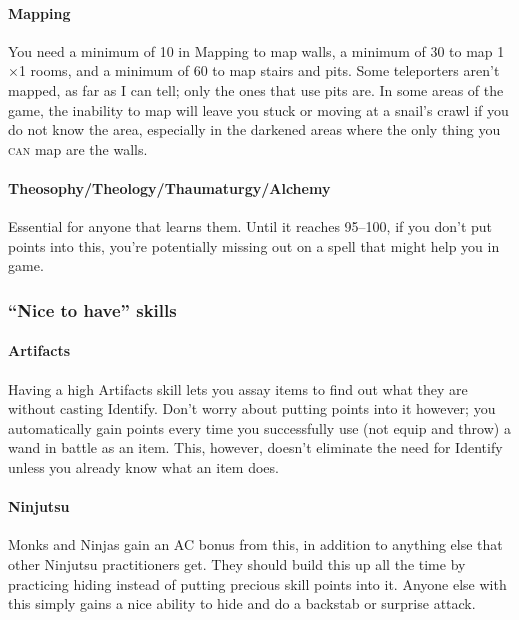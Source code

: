 \documentclass[12pt]{article}
\let\oldparagraph\paragraph
\renewcommand{\paragraph}[1]{\oldparagraph{#1}\mbox{}}
\newcommand{\indexSpell}[1]{\index{#1}}
\newcommand{\spell}[1]{#1\indexSpell{#1}}
\newcommand{\indexClass}[1]{\index{#1}}
\newcommand{\class}[1]{#1\indexClass{#1}}
\newcommand\textlcsc[1]{\texorpdfstring{\textsc{\MakeLowercase{#1}}}{#1}}
\begin{document}
\paragraph{Mapping} You need a minimum of 10 in Mapping to map walls, a
minimum of 30 to map 1$\times$1 rooms, and a minimum of 60 to map stairs and
pits. Some teleporters aren't mapped, as far as I can tell; only the ones
that use pits are. In some areas of the game, the inability to map will leave
you stuck or moving at a snail's crawl if you do not know the area,
especially in the darkened areas where the only thing you \textlcsc{CAN} map
are the walls.

\paragraph{Theosophy\fshyp{}Theology\fshyp{}Thaumaturgy\fshyp{}Alchemy}
Essential for anyone that learns them. Until it reaches 95--100, if you don't
put points into this, you're potentially missing out on a spell that might
help you in game.

\subsubsection{\texorpdfstring{``Nice to have''
skills}{Nice to have skills}}\label{nice-to-have-skills}

\paragraph{Artifacts} Having a high Artifacts skill lets you assay items to
find out what they are without casting \spell{Identify}. Don't worry about
putting points into it however; you automatically gain points every time you
successfully use (not equip and throw) a wand in battle as an item.  This,
however, doesn't eliminate the need for \spell{Identify} unless you already
know what an item does.

\paragraph{Ninjutsu} \class{Monk}s and \class{Ninja}s gain an AC bonus from
this, in addition to anything else that other Ninjutsu practitioners
get. They should build this up all the time by practicing hiding instead of
putting precious skill points into it. Anyone else with this simply gains a
nice ability to hide and do a backstab or surprise attack.
\end{document}
